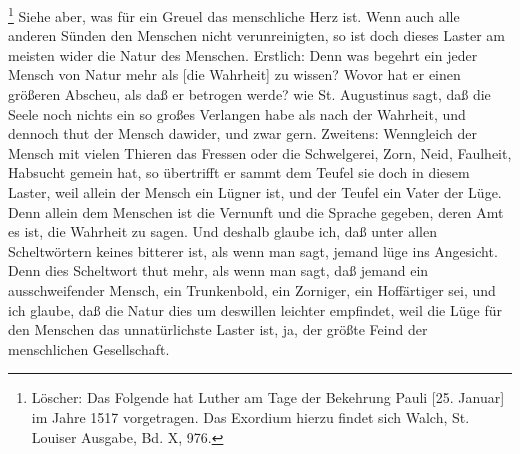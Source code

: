 \footnote{Löscher: Das Folgende hat Luther am Tage der Bekehrung Pauli [25. Januar] im Jahre 1517 vorgetragen. Das Exordium hierzu findet sich Walch, St. Louiser Ausgabe, Bd. X, 976.} Siehe aber, was für ein Greuel das menschliche Herz ist. Wenn auch alle anderen Sünden den Menschen nicht verunreinigten, so ist doch dieses Laster am meisten wider die Natur des Menschen. Erstlich: Denn was begehrt ein jeder Mensch von Natur mehr als [die Wahrheit] zu wissen? Wovor hat er einen größeren Abscheu, als daß er betrogen werde? wie St. Augustinus sagt, daß die Seele noch nichts ein so großes Verlangen habe als nach der Wahrheit, und dennoch thut der Mensch dawider, und zwar gern. Zweitens: Wenngleich der Mensch mit vielen Thieren das Fressen oder die Schwelgerei, Zorn, Neid, Faulheit, Habsucht gemein hat, so übertrifft er sammt dem Teufel sie doch in diesem Laster, weil allein der Mensch ein Lügner ist, und der Teufel ein Vater der Lüge. Denn allein dem Menschen ist die Vernunft und die Sprache gegeben, deren Amt es ist, die Wahrheit zu sagen. Und deshalb glaube ich, daß unter allen Scheltwörtern keines bitterer ist, als wenn man sagt, jemand lüge ins Angesicht. Denn dies Scheltwort thut mehr, als wenn man sagt, daß jemand ein ausschweifender Mensch, ein Trunkenbold, ein Zorniger, ein Hoffärtiger sei, und ich glaube, daß die Natur dies um deswillen leichter empfindet, weil die Lüge für den Menschen das unnatürlichste Laster ist, ja, der größte Feind der menschlichen Gesellschaft.

